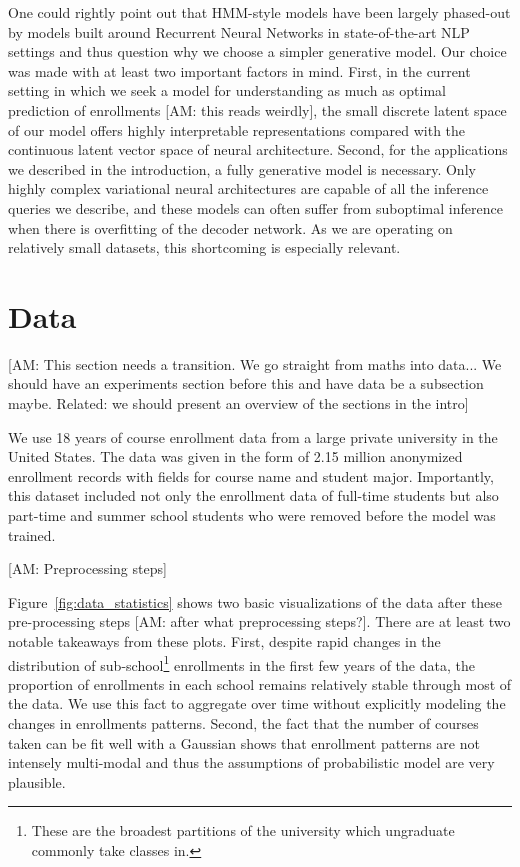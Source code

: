 \documentclass{edm_template}
\providecommand{\am}[1]{{\color{blue} [AM: #1]}}
\begin{document}
One could rightly point out that HMM-style models have been largely phased-out by models built around Recurrent Neural Networks in state-of-the-art NLP settings and thus question why we choose a simpler generative model. Our choice was made with at least two important factors in mind. First, in the current setting in which we seek a model for understanding as much as optimal prediction of enrollments \am{this reads weirdly}, the small discrete latent space of our model offers highly interpretable representations compared with the continuous latent vector space of neural architecture. Second, for the applications we described in the introduction, a fully generative model is necessary. Only highly complex variational neural architectures are capable of all the inference queries we describe, and these models can often suffer from suboptimal inference when there is overfitting of the decoder network. As we are operating on relatively small datasets, this shortcoming is especially relevant.

\section{Data}

\am{This section needs a transition. We go straight from maths into data... We should have an experiments section before this and have data be a subsection maybe. Related: we should present an overview of the sections in the intro}

We use 18 years of course enrollment data from a large private university in the United States. The data was given in the form of 2.15 million anonymized enrollment records with fields for course name and student major. Importantly, this dataset included not only the enrollment data of full-time students but also part-time and summer school students who were removed before the model was trained. 

\am{Preprocessing steps}

Figure~\ref{fig:data_statistics} shows two basic visualizations of the data after these pre-processing steps \am{after what preprocessing steps?}. There are at least two notable takeaways from these plots. First, despite rapid changes in the distribution of sub-school\footnote{These are the broadest partitions of the university which ungraduate commonly take classes in.} enrollments in the first few years of the data, the proportion of enrollments in each school remains relatively stable through most of the data. We use this fact to aggregate over time without explicitly modeling the changes in enrollments patterns. Second, the fact that the number of courses taken can be fit well with a Gaussian shows that enrollment patterns are not intensely multi-modal and thus the assumptions of probabilistic model are very plausible.
\end{document}
